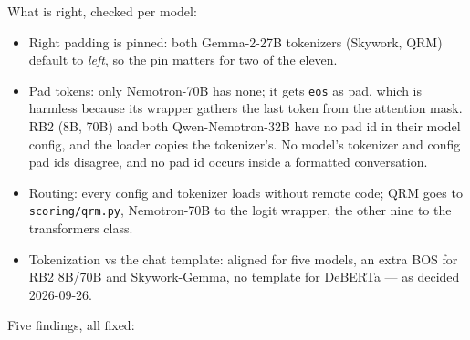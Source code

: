 \documentclass{article}
\begin{document}
What is right, checked per model:
\begin{itemize}
  \item Right padding is pinned: both Gemma-2-27B tokenizers (Skywork, QRM) default to \emph{left}, so the pin
        matters for two of the eleven.
  \item Pad tokens: only Nemotron-70B has none; it gets \texttt{eos} as pad, which is harmless because its wrapper
        gathers the last token from the attention mask. RB2 (8B, 70B) and both Qwen-Nemotron-32B have no pad id
        in their model config, and the loader copies the tokenizer's. No model's tokenizer and config pad ids
        disagree, and no pad id occurs inside a formatted conversation.
  \item Routing: every config and tokenizer loads without remote code; QRM goes to \texttt{scoring/qrm.py},
        Nemotron-70B to the logit wrapper, the other nine to the transformers class.
  \item Tokenization vs the chat template: aligned for five models, an extra BOS for RB2 8B/70B and
        Skywork-Gemma, no template for DeBERTa --- as decided 2026-09-26.
\end{itemize}
Five findings, all fixed:
\end{document}
